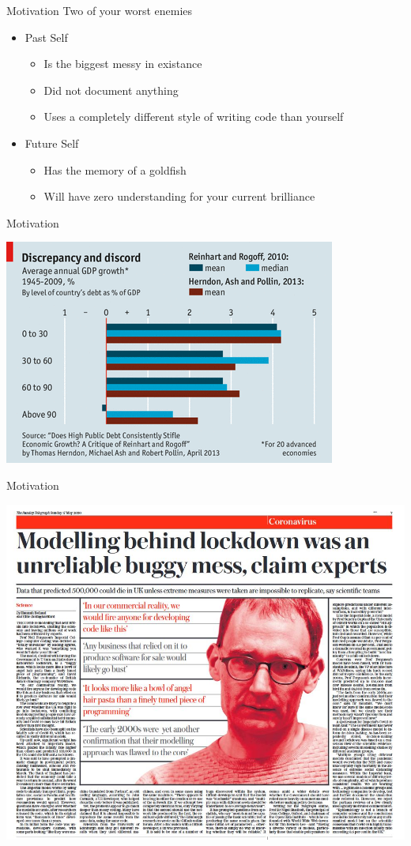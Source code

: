 \documentclass[xcolor=table]{beamer}\usepackage[]{graphicx}\usepackage[]{color}
\begin{document}
\begin{frame}{Motivation}
	Two of your worst enemies
	\begin{itemize}
			\item Past Self
			\begin{itemize}
			  \item Is the biggest messy in existance
			  \item Did not document anything
			  \item Uses a completely different style of writing code than yourself
			\end{itemize}
			\item Future Self
			\begin{itemize}
			  \item Has the memory of a goldfish
			  \item Will have zero understanding for your current brilliance
			\end{itemize}
	\end{itemize}
\end{frame}

\begin{frame}{Motivation}
\begin{center}
\includegraphics[width=.75\textwidth]{reinhart_rogoff.PNG}
\end{center}
\end{frame}


\begin{frame}{Motivation}
\begin{center}
\includegraphics[width=.75\textwidth]{bad_code_media.JPG}
\end{center}
\end{frame}
\end{document}
